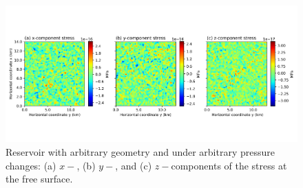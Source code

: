 \documentclass[journal abbreviation, manuscript]{copernicus}
\begin{document}
\begin{figure}[ht]
\includegraphics[width=12cm]{Fig/Figure_Null_stress_complex_reservoir.png}
\caption{Reservoir with arbitrary geometry and under arbitrary pressure changes: (a) $x-$, (b) $y-$, and (c) $z-$components of the stress at the free surface.}
\label{fig:Null_stress_complex_reservoir}
\end{figure}











\end{document}
